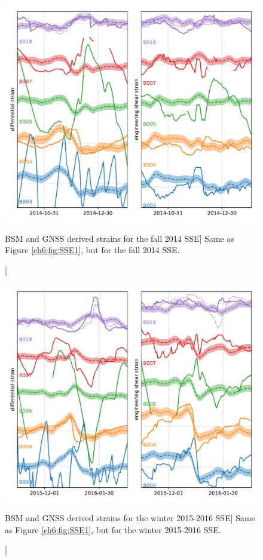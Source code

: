 \begin{figure}
\includegraphics{ch6/figures/SSE5.pdf}
\caption
[BSM and GNSS derived strains for the fall 2014 SSE]
{Same as Figure \ref{ch6:fig:SSE1}, but for the fall 2014 SSE.}   
\label{ch6:fig:SSE5}
\end{figure}

\begin{figure}
\includegraphics{ch6/figures/SSE6.pdf}
\caption
[BSM and GNSS derived strains for the winter 2015-2016 SSE]
{Same as Figure \ref{ch6:fig:SSE1}, but for the winter 2015-2016 SSE.}   
\label{ch6:fig:SSE6}
\end{figure}

